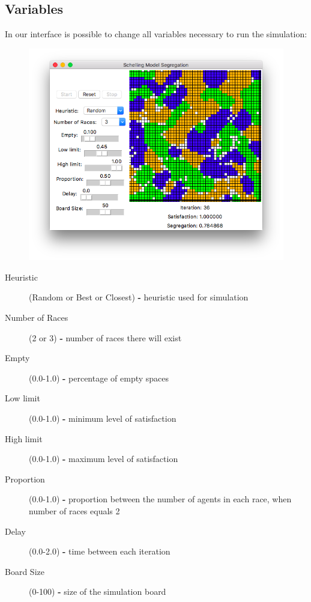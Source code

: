 \documentclass[a4paper,titlepage,11pt]{article}
\begin{document}
\newpage

\subsection{Variables}
In our interface is possible to change all variables necessary to run the simulation:

\begin{figure}[h]
    \centering
    \includegraphics[scale=0.50]{img/interface.png}
\end{figure}

\begin{description}
\item [ Heuristic ] (Random or Best or Closest) \textbf{-} heuristic used for simulation
\item [ Number of Races ] (2 or 3) \textbf{-} number of races there will exist
\item [ Empty ] (0.0-1.0) \textbf{-} percentage of empty spaces
\item [ Low limit ] (0.0-1.0) \textbf{-} minimum level of satisfaction
\item [ High limit ] (0.0-1.0) \textbf{-} maximum level of satisfaction
\item [ Proportion ] (0.0-1.0) \textbf{-} proportion between the number of agents in each race, when number of races equals 2
\item [ Delay ] (0.0-2.0) \textbf{-} time between each iteration
\item [ Board Size ] (0-100) \textbf{-} size of the simulation board
\end{description}
\end{document}
